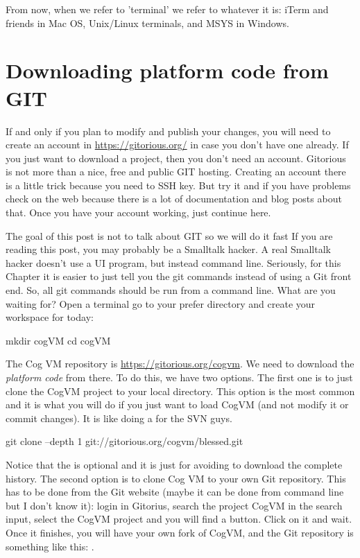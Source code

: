 \documentclass[a4paper,10pt,twoside]{book}
\begin{document}
From now, when we refer to 'terminal' we refer to whatever it is: iTerm and friends in Mac OS, Unix/Linux terminals, and MSYS in Windows.

\section{Downloading platform code from GIT}


If and only if you plan to modify and publish your changes, you will need to create an account in \url{https://gitorious.org/} in case you don't have one already. If you just want to download a project, then you don't need an account. Gitorious is not more than a nice, free and public GIT hosting. Creating an account there is a little trick because you need to SSH key. But try it and if you have problems check on the web because there is a lot of documentation and blog posts about that. Once you have your account working, just continue here.

The goal of this post is not to talk about GIT so we will do it fast  If you are reading this post, you may probably be a Smalltalk hacker. A real Smalltalk hacker doesn't use a UI program, but instead command line. Seriously, for this Chapter it is easier to just tell you the git commands instead of using a Git front end. So, all git commands should be run from a command line. What are you waiting for? Open a terminal go to your prefer directory and create your workspace for today:

\begin{code}{}
mkdir cogVM
cd cogVM
\end{code}


The Cog VM repository is \url{https://gitorious.org/cogvm}. We need to download the \emph{platform code} from there. To do this, we have two options. The first one is to just clone the CogVM project to your local directory. This option is the most common and it is what you will do if you just want to load CogVM (and not modify it or commit changes). It is like doing a  for the SVN guys.

\begin{code}{}
git clone --depth 1 git://gitorious.org/cogvm/blessed.git
\end{code}

Notice that the  is optional and it is just for avoiding to download the complete history. The second option is to clone Cog VM to your own Git repository. This has to be done from the Git website (maybe it can be done from command line but I don't know it): login in Gitorius, search the project CogVM in the search input, select the CogVM project and you will find a  button. Click on it and wait. Once it finishes, you will have your own fork of CogVM, and the Git repository is something like this: .
\end{document}

